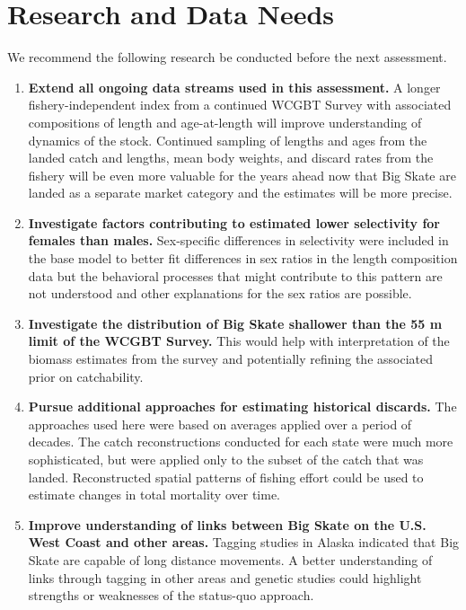 \documentclass[12pt,]{article}
\begin{document}
\hypertarget{research-and-data-needs-1}{%
\section{Research and Data Needs}\label{research-and-data-needs-1}}

We recommend the following research be conducted before the next
assessment.

\begin{enumerate}

\item \textbf{Extend all ongoing data streams used in this assessment.} A longer fishery-independent index from a continued WCGBT Survey with associated compositions of length and age-at-length will improve understanding of dynamics of the stock. Continued sampling of lengths and ages from the landed catch and lengths, mean body weights, and discard rates from the fishery will be even more valuable for the years ahead now that Big Skate are landed as a separate market category and the estimates will be more precise.

\item \textbf{Investigate factors contributing to estimated lower selectivity for females than males.} Sex-specific differences in selectivity were included in the base model to better fit differences in sex ratios in the length composition data but the behavioral processes that might contribute to this pattern are not understood and other explanations for the sex ratios are possible.

\item \textbf{Investigate the distribution of Big Skate shallower than the 55 m limit of the WCGBT Survey.} This would help with interpretation of the biomass estimates from the survey and potentially refining the associated prior on catchability.

\item \textbf{Pursue additional approaches for estimating historical discards.} The approaches used here were based on averages applied over a period of decades. The catch reconstructions conducted for each state were much more sophisticated, but were applied only to the subset of the catch that was landed. Reconstructed spatial patterns of fishing effort could be used to estimate changes in total mortality over time.

\item \textbf{Improve understanding of links between Big Skate on the U.S. West Coast and other areas.} Tagging studies in Alaska indicated that Big Skate are capable of long distance movements. A better understanding of links through tagging in other areas and genetic studies could highlight strengths or weaknesses of the status-quo approach.


\end{enumerate}
\end{document}
